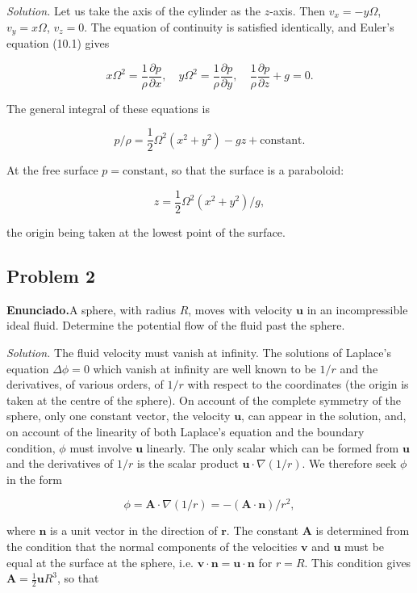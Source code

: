 \documentclass{article}
\begin{document}
\textit{Solution.} Let us take the axis of the cylinder as the $z$-axis. Then $v_x = -y\Omega$, $v_y = x\Omega$, $v_z = 0$. The equation of continuity is satisfied identically, and Euler's equation (10.1) gives

$$
x\Omega^2 = \frac{1}{\rho} \frac{\partial p}{\partial x}, \quad y\Omega^2 = \frac{1}{\rho} \frac{\partial p}{\partial y}, \quad \frac{1}{\rho} \frac{\partial p}{\partial z} + g = 0.
$$

The general integral of these equations is

$$
p/\rho = \frac{1}{2} \Omega^2 (x^2 + y^2) - gz + \text{constant}.
$$

At the free surface $p = \text{constant}$, so that the surface is a paraboloid:

$$
z = \frac{1}{2} \Omega^2 (x^2 + y^2)/g,
$$

the origin being taken at the lowest point of the surface.

\subsection*{Problem 2}

\textbf{Enunciado.}A sphere, with radius $R$, moves with velocity $\mathbf{u}$ in an incompressible ideal fluid. Determine the potential flow of the fluid past the sphere.

\textit{Solution.} The fluid velocity must vanish at infinity. The solutions of Laplace's equation $\Delta \phi = 0$ which vanish at infinity are well known to be $1/r$ and the derivatives, of various orders, of $1/r$ with respect to the coordinates (the origin is taken at the centre of the sphere). On account of the complete symmetry of the sphere, only one constant vector, the velocity $\mathbf{u}$, can appear in the solution, and, on account of the linearity of both Laplace's equation and the boundary condition, $\phi$ must involve $\mathbf{u}$ linearly. The only scalar which can be formed from $\mathbf{u}$ and the derivatives of $1/r$ is the scalar product $\mathbf{u} \cdot \nabla (1/r)$. We therefore seek $\phi$ in the form

$$
\phi = \mathbf{A} \cdot \nabla (1/r) = -(\mathbf{A} \cdot \mathbf{n})/r^2,
$$

where $\mathbf{n}$ is a unit vector in the direction of $\mathbf{r}$. The constant $\mathbf{A}$ is determined from the condition that the normal components of the velocities $\mathbf{v}$ and $\mathbf{u}$ must be equal at the surface at the sphere, i.e. $\mathbf{v} \cdot \mathbf{n} = \mathbf{u} \cdot \mathbf{n}$ for $r = R$. This condition gives $\mathbf{A} = \frac{1}{2} \mathbf{u} R^3$, so that
\end{document}
